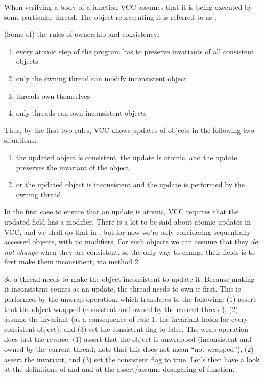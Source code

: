 When verifying a body of a function VCC assumes that it is being executed by some
particular thread.
The \vcc{\thread} object representing it is referred to as \vcc{\me}.

(Some of) the rules of ownership and consistency:
\begin{enumerate}
\item every atomic step of the program has to preserve invariants of all consistent objects 
\item only the owning thread can modify inconsistent object
\item threads own themselves
\item only threads can own inconsistent objects
\end{enumerate}
Thus, by the first two rules, VCC allows updates of objects in the following two situations:
\begin{enumerate}
\item the updated object is consistent, the update is atomic, and the update preserves the invariant of the object,
\item or the updated object is inconsistent and the update is performed by the owning thread.
\end{enumerate}
In the first case to ensure that an update is atomic, VCC requires that the
updated field has a  modifier.
There is a lot to be said about atomic updates in VCC, and we shall do
that in , but for now we're only considering sequentially
accessed objects, with no  modifiers.
For such objects we can assume that they \emph{do not change}
when they are consistent, so the only way to change their fields is to
first make them inconsistent, \ie via method 2.

So a thread needs to make the object inconsistent to update it.
Because making it inconsistent counts as an update, the thread needs
to own it first.
This is performed by the unwrap operation, which translates to the following:
(1) assert that the object wrapped (consistent and owned by the current thread), 
(2) assume the invariant (as a consequence of rule 1, the invariant holds for every consistent object),
and (3) set the consistent flag to false.
The wrap operation does just the reverse:
(1) assert that the object is unwrapped (inconsistent and owned by the current thread;
note that this does not mean ``not wrapped''),
(2) assert the invariant, 
and (3) set the consistent flag to true.
Let's then have a look at the definitions of  and %
and at the assert/assume desugaring of  function.


